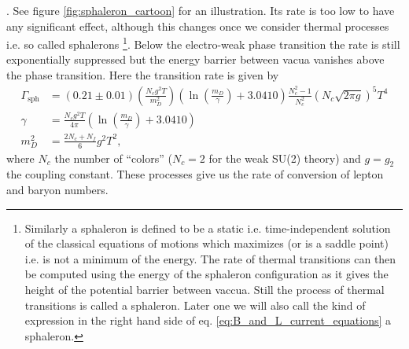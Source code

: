 \documentclass[master,       %
               twoside,        %
               BCOR10mm,       %
               english,ngerman, %
               ]{GAUBM}
\begin{document}
\begin{otherlanguage}{english}
{}. See figure \ref{fig:sphaleron_cartoon} for an illustration.
Its rate is too low to have any significant effect, although this changes once we consider thermal processes i.e. so called sphalerons \footnote{
Similarly a sphaleron is defined to be a static i.e. time-independent solution of the classical equations of motions which maximizes (or is a saddle point) i.e. is not a minimum of the energy.
The rate of thermal transitions can then be computed using the energy of the sphaleron configuration as it gives the height of the potential barrier between vaccua.
Still the process of thermal transitions is called a sphaleron. Later one we will also call the kind of expression in the right hand side of eq. \eqref{eq:B_and_L_current_equations} a sphaleron.
}.
Below the electro-weak phase transition the rate is still exponentially suppressed but the energy barrier between vacua vanishes above the phase transition. Here the transition rate is given by \cite{sphaleron_rate_symmetric_phase_Moore_2011}
\begin{align}
	\Gamma_{\mathrm{sph}} &= (0.21 \pm 0.01) \left(\frac{N_c g^2 T}{m_D^2} \right) \left(\ln \left(\frac{m_D}{\gamma} \right) + 3.0410 \right) \frac{N_c^2 - 1}{N_c^2} (N_c \sqrt{2 \pi g})^5 T^4 \\
	\gamma &= \frac{N_c g^2 T}{4 \pi} \left(\ln \left(\frac{m_D}{\gamma}\right) + 3.0410 \right) \nonumber \\
	m_D^2 &= \frac{2N_c + N_f}{6} g^2 T^2 \nonumber,
\end{align}
where $N_c$ the number of ``colors'' ($N_c = 2$ for the weak SU(2) theory) and $g = g_2$ the coupling constant.
These processes give us the rate of conversion of lepton and baryon numbers.


\end{otherlanguage}
\end{document}

